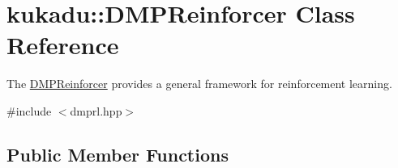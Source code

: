 \hypertarget{classkukadu_1_1DMPReinforcer}{}\section{kukadu\+:\+:D\+M\+P\+Reinforcer Class Reference}
\label{classkukadu_1_1DMPReinforcer}


The \hyperlink{classkukadu_1_1DMPReinforcer}{D\+M\+P\+Reinforcer} provides a general framework for reinforcement learning.  




{\ttfamily \#include $<$dmprl.\+hpp$>$}

\subsection*{Public Member Functions}

